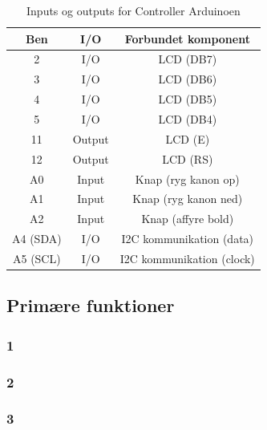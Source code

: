 \begin{table}[H]
	\caption{Inputs og outputs for Controller Arduinoen} %
	\label{tab:IOController}
	\centering
		\begin{tabular}{c|c c} 
		Ben & I/O & Forbundet komponent\\ [0.5ex] 
		\hline 
			2 & I/O & LCD (DB7)\\
			3 & I/O & LCD (DB6)\\
			4 &I/O & LCD (DB5)\\
			5 &I/O & LCD (DB4)\\
			11 & Output & LCD (E)\\
			12 &Output & LCD (RS)\\
			A0 & Input & Knap (ryg kanon op)\\
			A1 & Input & Knap (ryg kanon ned)\\			
			A2 & Input & Knap (affyre bold)\\
			A4 (SDA) & I/O & I2C kommunikation (data)\\
			A5 (SCL) & I/O & I2C kommunikation (clock)\\[1ex]
		\hline %
	\end{tabular}
\end{table}
\subsection{Primære funktioner}\label{sec:primaerefunc}
\subsubsection{1}
\subsubsection{2}
\subsubsection{3}